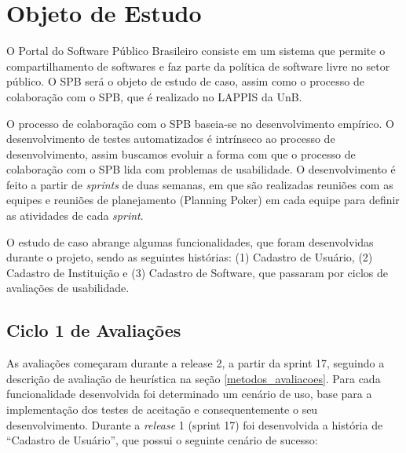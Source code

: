 \section{Objeto de Estudo}

O Portal do Software Público Brasileiro consiste em um sistema que permite o compartilhamento de softwares e faz parte da política de software livre no setor público.
O SPB será o objeto de estudo de caso, assim como o processo de colaboração com o SPB, que é realizado no LAPPIS da UnB.

O processo de colaboração com o SPB baseia-se no desenvolvimento empírico. O desenvolvimento de testes automatizados é intrínseco ao processo de desenvolvimento, assim buscamos evoluir a forma com que o processo de colaboração com o SPB lida com problemas de usabilidade.
O desenvolvimento é feito a partir de \textit{sprints} de duas semanas, em que são realizadas reuniões com as equipes e reuniões de planejamento (Planning Poker) em cada equipe para definir as atividades de cada \textit{sprint}.

O estudo de caso abrange algumas funcionalidades, que foram desenvolvidas durante o projeto, sendo as seguintes histórias: (1) Cadastro de Usuário, (2) Cadastro de Instituição e (3) Cadastro de Software, que passaram por ciclos de avaliações de usabilidade. 

\subsection{Ciclo 1 de Avaliações}

As avaliações começaram durante a release 2, a partir da sprint 17, seguindo a descrição de avaliação de heurística na seção \ref{metodos_avaliacoes}.
%
Para cada funcionalidade desenvolvida foi determinado um cenário de uso, base para a implementação dos testes de aceitação e consequentemente o seu desenvolvimento.
%
Durante a \textit{release} 1 (sprint 17) foi desenvolvida a história de ``Cadastro de Usuário'', que possui o seguinte cenário de sucesso:

